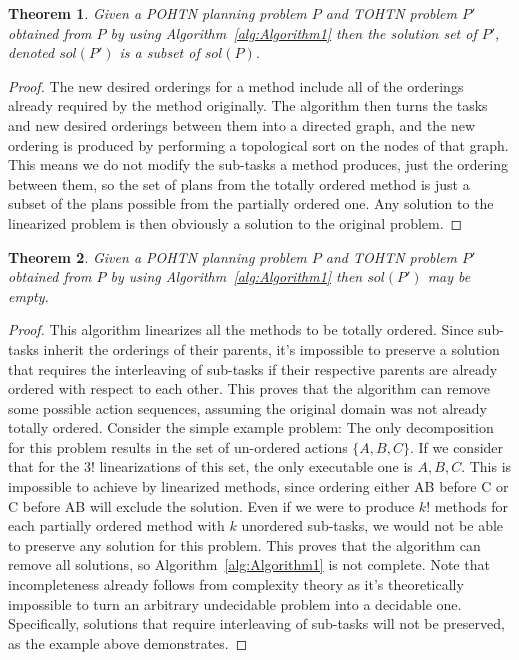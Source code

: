 \documentclass[letterpaper]{article} %
\newtheorem{theorem}{Theorem}
\begin{document}
\begin{theorem}\label{thm:Soundness}
	Given a POHTN planning problem $P$ and TOHTN problem
	$P'$ obtained from $P$ by using Algorithm~\ref{alg:Algorithm1}
	then the solution set of $P'$, denoted $sol(P')$ is a subset of $sol(P)$.
\end{theorem}
\begin{proof}
	The new desired orderings for a method include all of the orderings already required by the method originally. The algorithm then turns the tasks and new desired orderings between them into a directed graph, and the new ordering is produced by performing a topological sort on the nodes of that graph. This means we do not modify the sub-tasks a method produces, just the ordering between them, so the set of plans from the totally ordered method is just a subset of the plans possible from the partially ordered one. Any solution to the linearized problem is then obviously a solution to the original problem.
\end{proof}

\begin{theorem}\label{thm:notCompleteness}
	Given a POHTN planning problem $P$ and TOHTN problem
	$P'$ obtained from $P$ by using Algorithm~\ref{alg:Algorithm1}
	then $sol(P')$ may be empty.
\end{theorem}
\begin{proof}
	This algorithm linearizes all the methods to be totally ordered. Since sub-tasks inherit the orderings of their parents, it's impossible to preserve a solution that requires the interleaving of sub-tasks if their respective parents are already ordered with respect to each other. This proves that the algorithm can remove some possible action sequences, assuming the original domain was not already totally ordered. Consider the simple example problem:
	The only decomposition for this problem results in the set of un-ordered actions $\{A, B, C\}$.
	If we consider that for the $3!$ linearizations of this set, the only executable one is $A, B, C$. This is impossible to achieve by linearized methods, since ordering either AB before C or C before AB will exclude the solution. 
	Even if we were to produce $k!$ methods for each partially ordered method with $k$ unordered sub-tasks, we would not be able to preserve any solution for this problem.
	This proves that the algorithm can remove all solutions, so Algorithm~\ref{alg:Algorithm1} is not complete. Note that incompleteness already follows from complexity theory as it's theoretically impossible to turn an arbitrary undecidable problem into a decidable one.
	Specifically, solutions that require interleaving of sub-tasks will not be preserved, as the example above demonstrates.
\end{proof}
\end{document}

